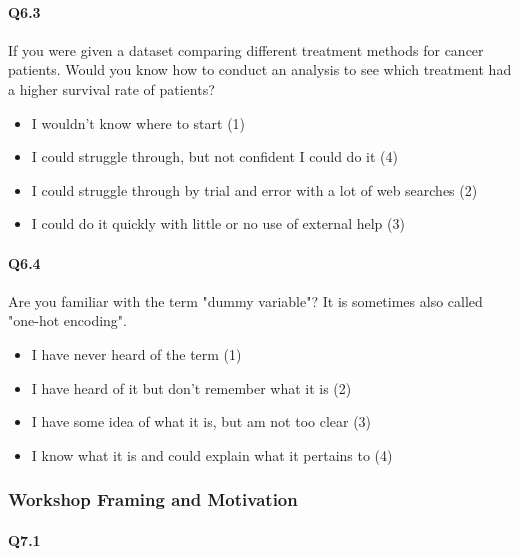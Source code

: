 \documentclass[020-persona\_validation.tex]{subfiles}
\begin{document}
        \paragraph{Q6.3}

            If you were given a dataset comparing different treatment methods for
            cancer patients. Would you know how to conduct an analysis to see which
            treatment had a higher survival rate of patients?

                \begin{itemize}
                    \item I wouldn't know where to start  (1)
                    \item I could struggle through, but not confident I could do it  (4)
                    \item I could struggle through by trial and error with a lot of web searches  (2)
                    \item I could do it quickly with little or no use of external help  (3)
                \end{itemize}

        \paragraph{Q6.4}

            Are you familiar with the term "dummy variable"? It is sometimes also
            called "one-hot encoding".

            \begin{itemize}
                \item I have never heard of the term  (1)
                \item I have heard of it but don’t remember what it is  (2)
                \item I have some idea of what it is, but am not too clear  (3)
                \item I know what it is and could explain what it pertains to  (4)
            \end{itemize}

    \subsubsection{Workshop Framing and Motivation}

        \paragraph{Q7.1}
\end{document}
